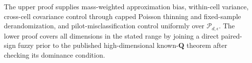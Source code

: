 The upper proof supplies mass-weighted approximation bias, within-cell variance, cross-cell covariance control through capped Poisson thinning and fixed-sample derandomization, and pilot-misclassification control uniformly over \(\mathcal P_{d,\epsilon}\).  The lower proof covers all dimensions in the stated range by joining a direct paired-sign fuzzy prior to the published high-dimensional known-\(\mathbf Q\) theorem after checking its dominance condition.